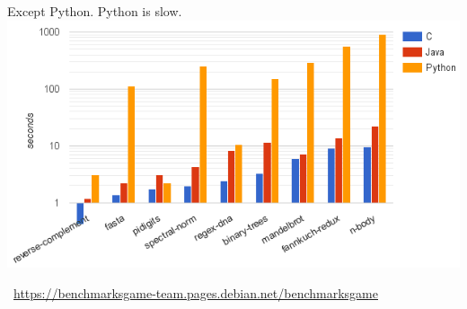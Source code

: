 \documentclass[aspectratio=169]{beamer}
\begin{document}
\begin{frame}{Except Python. Python is slow.}
\vspace{0.25 cm}
\includegraphics[width=\linewidth]{benchmark-games.png}

\vspace{-0.5 cm}
\mbox{ }\hfill\textcolor{blue}{\tiny \url{https://benchmarksgame-team.pages.debian.net/benchmarksgame}}\hfill\mbox{ }

\end{frame}




\end{document}

